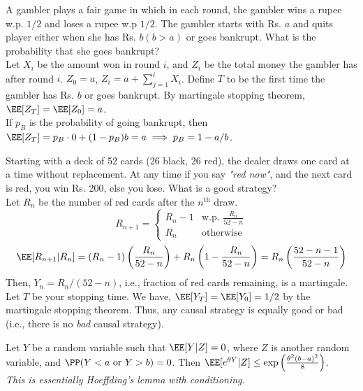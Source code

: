 \begin{eg}
A gambler plays a fair game in which in each round, the gambler wins a rupee w.p. $1/2$ and loses a rupee w.p $1/2$. The gambler starts with Rs. $a$ and quits player either when she has Rs. $b (b > a)$ or goes bankrupt. What is the probability that she goes bankrupt?\\
Let $X_i$ be the amount won in round $i$, and $Z_i$ be the total money the gambler has after round $i$. $Z_0 = a$, $Z_i = a+\sum_{j=1}^i X_i$. Define $T$ to be the first time the gambler has Rs. $b$ or goes bankrupt. By martingale stopping theorem, $\EE[Z_T] = \EE[Z_0] = a$. \\
If $p_B$ is the probability of going bankrupt, then $\EE[Z_T] = p_B \cdot 0 + (1-p_B) b = a \implies p_B = 1-a/b$.
\end{eg}
\begin{eg}
Starting with a deck of 52 cards (26 black, 26 red), the dealer draws one card at a time without replacement. At any time if you say \textit{"red now"}, and the next card is red, you win Rs. 200, else you lose. What is a good strategy?\\
Let $R_n$ be the number of red cards after the $n^\text{th}$ draw.
\[
R_{n+1} = \begin{cases}
    R_n - 1 &\text{w.p. } \frac{R_n}{52-n} \\ 
    R_n &\text{otherwise}
\end{cases}
\]
\[
\EE[R_{n+1} | R_n] = (R_n-1)\left(\frac{R_n}{52-n}\right) + R_n\left(1-\frac{R_n}{52-n}\right) = R_n\left(\frac{52-n-1}{52-n}\right)
\]    
Then, $Y_n = R_n/(52-n)$, i.e., fraction of red cards remaining, is a martingale. Let $T$ be your stopping time. We have, $\EE[Y_T] = \EE[Y_0] = 1/2$ by the martingale stopping theorem. Thus, any causal strategy is equally good or bad (i.e., there is no \textit{bad} causal strategy).
\end{eg}
\begin{hw}\label{hw:prop-conditional-hoeffding}
Let $Y$ be a random variable such that $\EE[Y|Z] = 0$, where $Z$ is another random variable, and $\PP(Y < a \text{ or } Y > b) = 0$. Then $\EE[e^{\theta Y} | Z] \leq \exp\left(\frac{\theta^2 (b-a)^2}{8}\right)$. \\
\textit{This is essentially Hoeffding's lemma with conditioning.}
\end{hw}